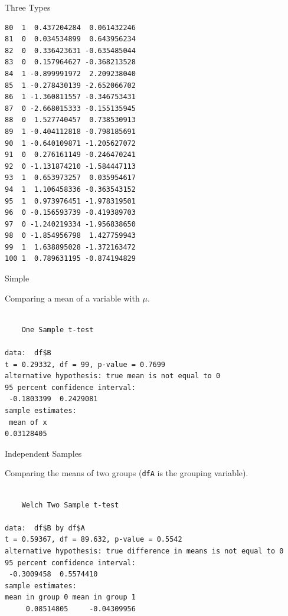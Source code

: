 \begin{frame}[fragile]{Three Types}
\begin{verbatim}
80  1  0.437204284  0.061432246
81  0  0.034534899  0.643956234
82  0  0.336423631 -0.635485044
83  0  0.157964627 -0.368213528
84  1 -0.899991972  2.209238040
85  1 -0.278430139 -2.652066702
86  1 -1.360811557 -0.346753431
87  0 -2.668015333 -0.155135945
88  0  1.527740457  0.738530913
89  1 -0.404112818 -0.798185691
90  1 -0.640109871 -1.205627072
91  0  0.276161149 -0.246470241
92  0 -1.131874210 -1.584447113
93  1  0.653973257  0.035954617
94  1  1.106458336 -0.363543152
95  1  0.973976451 -1.978319501
96  0 -0.156593739 -0.419389703
97  0 -1.240219334 -1.956838650
98  0 -1.854956798  1.427759943
99  1  1.638895028 -1.372163472
100 1  0.789631195 -0.874194829
\end{verbatim}

\end{frame}

\begin{frame}[fragile]{Simple}

\center
Comparing a mean of a variable with \(\mu\).

\begin{Shaded}
\begin{Highlighting}[]
\OperatorTok{$} \NormalTok{)}
\end{Highlighting}
\end{Shaded}

\begin{verbatim}

    One Sample t-test

data:  df$B
t = 0.29332, df = 99, p-value = 0.7699
alternative hypothesis: true mean is not equal to 0
95 percent confidence interval:
 -0.1803399  0.2429081
sample estimates:
 mean of x 
0.03128405 
\end{verbatim}

\end{frame}

\begin{frame}[fragile]{Independent Samples}

\center
Comparing the means of two groups (\texttt{dfA} is the grouping
variable).

\begin{Shaded}
\begin{Highlighting}[]
\OperatorTok{$}\OperatorTok{~}\StringTok{ }\OperatorTok{$}
\end{Highlighting}
\end{Shaded}

\begin{verbatim}

    Welch Two Sample t-test

data:  df$B by df$A
t = 0.59367, df = 89.632, p-value = 0.5542
alternative hypothesis: true difference in means is not equal to 0
95 percent confidence interval:
 -0.3009458  0.5574410
sample estimates:
mean in group 0 mean in group 1 
     0.08514805     -0.04309956 
\end{verbatim}

\end{frame}

